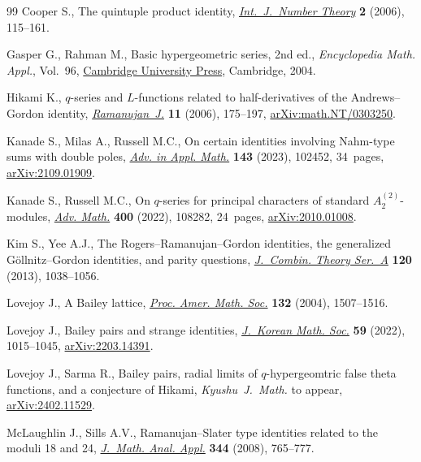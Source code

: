 \documentclass[pdftex]{sigma}
\numberwithin{equation}{section}
\begin{document}
\begin{thebibliography}{99}
Cooper S., The quintuple product identity, \href{https://doi.org/10.1142/S1793042106000401}{\textit{Int.~J.~Number Theory}}
 \textbf{2} (2006), 115--161.

Gasper G., Rahman M., Basic hypergeometric series, 2nd ed., \textit{Encyclopedia Math.
 Appl.}, Vol.~96, \href{https://doi.org/10.1017/CBO9780511526251}{Cambridge University Press}, Cambridge, 2004.

Hikami K., {$q$}-series and {$L$}-functions related to half-derivatives of the
 {A}ndrews--{G}ordon identity, \href{https://doi.org/10.1007/s11139-006-6506-1}{\textit{Ramanujan~J.}} \textbf{11} (2006),
 175--197, \href{https://arxiv.org/abs/math.NT/0303250}{arXiv:math.NT/0303250}.

Kanade S., Milas A., Russell M.C., On certain identities involving {N}ahm-type
 sums with double poles, \href{https://doi.org/10.1016/j.aam.2022.102452}{\textit{Adv. in Appl. Math.}} \textbf{143} (2023),
 102452, 34~pages, \href{https://arxiv.org/abs/2109.01909}{arXiv:2109.01909}.

Kanade S., Russell M.C., On {$q$}-series for principal characters of standard
 {$A^{(2)}_2$}-modules, \href{https://doi.org/10.1016/j.aim.2022.108282}{\textit{Adv. Math.}} \textbf{400} (2022), 108282,
 24~pages, \href{https://arxiv.org/abs/2010.01008}{arXiv:2010.01008}.

Kim S., Yee A.J., The {R}ogers--{R}amanujan--{G}ordon identities, the
 generalized {G}\"ollnitz--{G}ordon identities, and parity questions,
 \href{https://doi.org/10.1016/j.jcta.2013.02.005}{\textit{J.~Combin. Theory Ser.~A}} \textbf{120} (2013), 1038--1056.

Lovejoy J., A {B}ailey lattice, \href{https://doi.org/10.1090/S0002-9939-03-07247-2}{\textit{Proc. Amer. Math. Soc.}} \textbf{132}
 (2004), 1507--1516.

Lovejoy J., Bailey pairs and strange identities, \href{https://doi.org/10.4134/JKMS.j220167}{\textit{J.~Korean Math. Soc.}}
 \textbf{59} (2022), 1015--1045, \href{https://arxiv.org/abs/2203.14391}{arXiv:2203.14391}.

Lovejoy J., Sarma R., Bailey pairs, radial limits of $q$-hypergeomtric false
 theta functions, and a conjecture of {H}ikami, \textit{Kyushu~J.~Math.} {t}o
 appear, \href{https://arxiv.org/abs/2402.11529}{arXiv:2402.11529}.

McLaughlin J., Sills A.V., {R}amanujan--{S}later type identities related to the
 moduli 18 and 24, \href{https://doi.org/10.1016/j.jmaa.2008.03.033}{\textit{J.~Math. Anal. Appl.}} \textbf{344} (2008),
 765--777.


\end{thebibliography}
\end{document}
